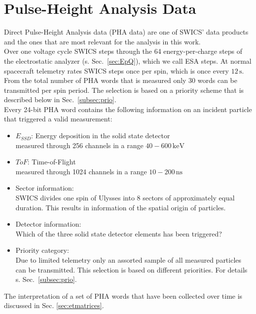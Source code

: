 \section{Pulse-Height Analysis Data}
\label{sec_dataprod}
Direct Pulse-Height Analysis data (PHA data) are one of SWICS' data products and the ones that are most relevant for the analysis in this work.\\
Over one voltage cycle SWICS steps through the 64 energy-per-charge steps of the electrostatic analyzer (s. Sec.~\ref{sec:EpQ}), which we call ESA steps. At normal spacecraft telemetry rates SWICS steps once per spin, which is once every $12\,\mathrm{s}$. From the total number of PHA words that is measured only 30 words can be transmitted per spin period. The selection is based on a priority scheme that is described below in Sec.~\ref{subsec:prio}.\\
Every 24-bit PHA word contains the following information on an incident particle that triggered a valid measurement:
\begin{itemize}
	\item $E_{SSD}$: Energy deposition in the solid state detector \\
	measured through 256 channels in a range $40 - 600\,\mathrm{keV}$
	\item $ToF$: Time-of-Flight\\
	measured through 1024 channels in a range $10 - 200\,\mathrm{ns}$
	\item Sector information:\\
	SWICS divides one spin of Ulysses into 8 sectors of approximately equal duration. This results in information of the spatial origin of particles.
	\item Detector information: \\
	Which of the three solid state detector elements has been triggered?
	\item Priority category: \\
	Due to limited telemetry only an assorted sample of all measured particles can be transmitted. This selection is based on different priorities. For details s. Sec.~\ref{subsec:prio}.
\end{itemize}
The interpretation of a set of PHA words that have been collected over time is discussed in Sec. \ref{sec:etmatrices}. 
%
